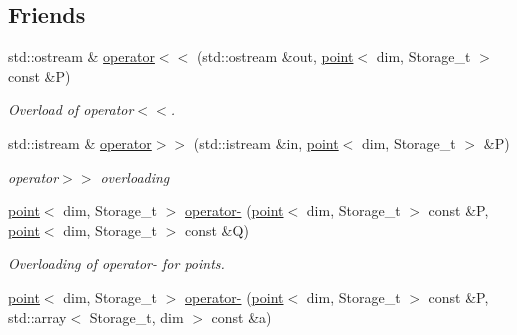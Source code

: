 \subsection*{Friends}
\begin{DoxyCompactItemize}
\item 
\hypertarget{classBGLgeom_1_1point_ad6901581113dba74a3f4dd1b97674abc}{
std::ostream \& \hyperlink{classBGLgeom_1_1point_ad6901581113dba74a3f4dd1b97674abc}{operator$<$$<$} (std::ostream \&out, \hyperlink{classBGLgeom_1_1point}{point}$<$ dim, Storage\_\-t $>$ const \&P)}
\label{classBGLgeom_1_1point_ad6901581113dba74a3f4dd1b97674abc}

\begin{DoxyCompactList}\small\item\em Overload of operator$<$$<$. \item\end{DoxyCompactList}\item 
\hypertarget{classBGLgeom_1_1point_a857310f166ea07855140beb33d8d024f}{
std::istream \& \hyperlink{classBGLgeom_1_1point_a857310f166ea07855140beb33d8d024f}{operator$>$$>$} (std::istream \&in, \hyperlink{classBGLgeom_1_1point}{point}$<$ dim, Storage\_\-t $>$ \&P)}
\label{classBGLgeom_1_1point_a857310f166ea07855140beb33d8d024f}

\begin{DoxyCompactList}\small\item\em operator$>$$>$ overloading \item\end{DoxyCompactList}\item 
\hypertarget{classBGLgeom_1_1point_a0cac4dae9e5eb08107e90bf19dd86e29}{
\hyperlink{classBGLgeom_1_1point}{point}$<$ dim, Storage\_\-t $>$ \hyperlink{classBGLgeom_1_1point_a0cac4dae9e5eb08107e90bf19dd86e29}{operator-\/} (\hyperlink{classBGLgeom_1_1point}{point}$<$ dim, Storage\_\-t $>$ const \&P, \hyperlink{classBGLgeom_1_1point}{point}$<$ dim, Storage\_\-t $>$ const \&Q)}
\label{classBGLgeom_1_1point_a0cac4dae9e5eb08107e90bf19dd86e29}

\begin{DoxyCompactList}\small\item\em Overloading of operator-\/ for points. \item\end{DoxyCompactList}\item 
\hypertarget{classBGLgeom_1_1point_a9e396f2f21caef6bf31153c3cf2040dd}{
\hyperlink{classBGLgeom_1_1point}{point}$<$ dim, Storage\_\-t $>$ \hyperlink{classBGLgeom_1_1point_a9e396f2f21caef6bf31153c3cf2040dd}{operator-\/} (\hyperlink{classBGLgeom_1_1point}{point}$<$ dim, Storage\_\-t $>$ const \&P, std::array$<$ Storage\_\-t, dim $>$ const \&a)}
\label{classBGLgeom_1_1point_a9e396f2f21caef6bf31153c3cf2040dd}


\end{DoxyCompactItemize}
